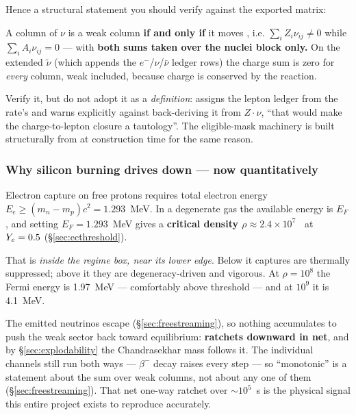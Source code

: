 Hence a structural statement you should verify against the exported matrix:

\begin{invariant}
A column of $\nu$ is a weak column \textbf{if and only if} it moves \Ye{}, i.e.
$\sum_i Z_i \nu_{ij} \neq 0$ while $\sum_i A_i \nu_{ij} = 0$ --- with
\textbf{both sums taken over the nuclei block only.} On the extended
$\tilde\nu$ (which appends the $e^-$/$\nu$/$\bar\nu$ ledger rows) the charge sum
is zero for \emph{every} column, weak included, because charge is conserved by
the reaction.
\end{invariant}

Verify it, but do not adopt it as a \emph{definition}: 
assigns the lepton ledger from the rate's  and warns explicitly
against back-deriving it from $Z\cdot\nu$, ``that would make the
charge-to-lepton closure a tautology''. The eligible-mask machinery is built
structurally from  at construction time for the same reason.

\subsubsection{Why silicon burning drives \texorpdfstring{\Ye{}}{Ye} down --- now
  quantitatively}
\label{sec:yedown}

Electron capture on free protons requires total electron energy
$E_e \geq (m_n - m_p)c^2 = 1.293$~MeV. In a degenerate gas the available energy
is $E_F$, and setting $E_F = 1.293$~MeV gives a \textbf{critical density
$\rho \approx 2.4\times10^{7}$~\gcc} at $Y_{e} = 0.5$ (\S\ref{sec:ecthreshold}).

That is \emph{inside the regime box, near its lower edge}. Below it captures are
thermally suppressed; above it they are degeneracy-driven and vigorous. At
$\rho = 10^{8}$ the Fermi energy is 1.97~MeV --- comfortably above threshold ---
and at $10^{9}$ it is 4.1~MeV.

The emitted neutrinos escape (\S\ref{sec:freestreaming}), so nothing accumulates
to push the weak sector back toward equilibrium: \textbf{\Ye{} ratchets downward
in net}, and by \S\ref{sec:explodability} the Chandrasekhar mass follows it. The
individual channels still run both ways --- $\beta^-$ decay raises \Ye{} every
step --- so ``monotonic'' is a statement about the sum over weak columns, not
about any one of them (\S\ref{sec:freestreaming}). That net one-way ratchet over
${\sim}10^{5}$~s is the physical signal this entire project exists to reproduce
accurately.

